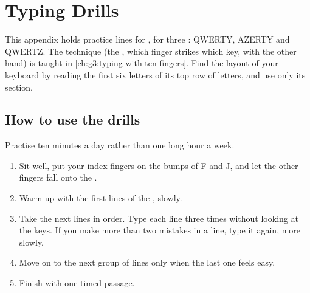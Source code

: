 \chapter{Typing Drills}\label{ch:typ:typing-drills}

This appendix holds practice lines for , for three : QWERTY, AZERTY and QWERTZ. The technique (the , which finger
strikes which key,  with the other hand) is taught in
\cref{ch:g3:typing-with-ten-fingers}. Find the layout of your keyboard by
reading the first six letters of its top row of letters, and use only its
section.

\section{How to use the drills}

\begin{method}\label{met:typ:typing-drills:session}
Practise ten minutes a day rather than one long hour a week.
\begin{enumerate}
\item Sit well, put your index fingers on the bumps of F and J, and let the
  other fingers fall onto the .
\item Warm up with the first lines of the , slowly.
\item Take the next lines in order. Type each line three times without looking
  at the keys. If you make more than two mistakes in a line, type it again,
  more slowly.
\item Move on to the next group of lines only when the last one feels easy.
\item Finish with one timed passage.
\end{enumerate}
\end{method}

